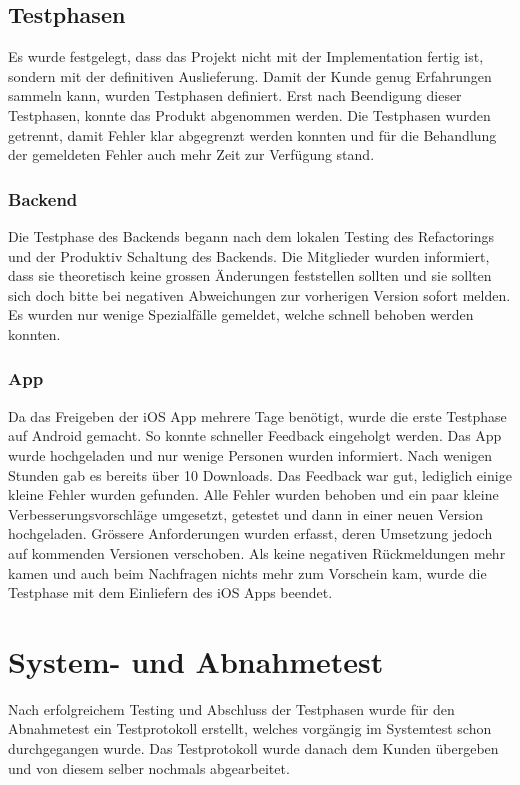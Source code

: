 \subsection{Testphasen}
Es wurde festgelegt, dass das Projekt nicht mit der Implementation fertig ist, sondern mit der definitiven Auslieferung. Damit der Kunde genug Erfahrungen sammeln kann, wurden Testphasen definiert. Erst nach Beendigung dieser Testphasen, konnte das Produkt abgenommen werden. Die Testphasen wurden getrennt, damit Fehler klar abgegrenzt werden konnten und für die Behandlung der gemeldeten Fehler auch mehr Zeit zur Verfügung stand.

\subsubsection{Backend}
Die Testphase des Backends begann nach dem lokalen Testing des Refactorings und der Produktiv Schaltung des Backends. Die Mitglieder wurden informiert, dass sie theoretisch keine grossen Änderungen feststellen sollten und sie sollten sich doch bitte bei negativen Abweichungen zur vorherigen Version sofort melden. Es wurden nur wenige Spezialfälle gemeldet, welche schnell behoben werden konnten.

\subsubsection{App}
Da das Freigeben der iOS App mehrere Tage benötigt, wurde die erste Testphase auf Android gemacht. So konnte schneller Feedback eingeholgt werden. Das App wurde hochgeladen und nur wenige Personen wurden informiert. Nach wenigen Stunden gab es bereits über 10 Downloads. Das Feedback war gut, lediglich einige kleine Fehler wurden gefunden. Alle Fehler wurden behoben und ein paar kleine Verbesserungsvorschläge umgesetzt, getestet und dann in einer neuen Version hochgeladen. Grössere Anforderungen wurden erfasst, deren Umsetzung jedoch auf kommenden Versionen verschoben. Als keine negativen Rückmeldungen mehr kamen und auch beim Nachfragen nichts mehr zum Vorschein kam, wurde die Testphase mit dem Einliefern des iOS Apps beendet.

\section{System- und Abnahmetest}
Nach erfolgreichem Testing und Abschluss der Testphasen wurde für den Abnahmetest ein Testprotokoll erstellt, welches vorgängig im Systemtest schon durchgegangen wurde. Das Testprotokoll wurde danach dem Kunden übergeben und von diesem selber nochmals abgearbeitet.


